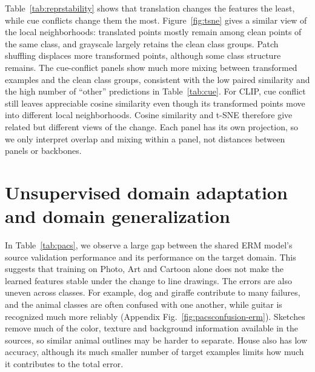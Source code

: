 \documentclass{article}
\begin{document}
Table~\ref{tab:reprstability} shows that translation changes the features the least, while cue conflicts change them the most. Figure~\ref{fig:tsne} gives a similar view of the local neighborhoods: translated points mostly remain among clean points of the same class, and grayscale largely retains the clean class groups. Patch shuffling displaces more transformed points, although some class structure remains. The cue-conflict panels show much more mixing between transformed examples and the clean class groups, consistent with the low paired similarity and the high number of ``other'' predictions in Table~\ref{tab:cue}. For CLIP, cue conflict still leaves appreciable cosine similarity even though its transformed points move into different local neighborhoods. Cosine similarity and t-SNE therefore give related but different views of the change. Each panel has its own projection, so we only interpret overlap and mixing within a panel, not distances between panels or backbones.

\FloatBarrier
\section{Unsupervised domain adaptation and domain generalization}
\label{sec:domain}
In Table~\ref{tab:pacs}, we observe a large gap between the shared ERM model's source validation performance and its performance on the target domain. This suggests that training on Photo, Art and Cartoon alone does not make the learned features stable under the change to line drawings. The errors are also uneven across classes. For example, dog and giraffe contribute to many failures, and the animal classes are often confused with one another, while guitar is recognized much more reliably (Appendix Fig.~\ref{fig:pacsconfusion-erm}). Sketches remove much of the color, texture and background information available in the sources, so similar animal outlines may be harder to separate. House also has low accuracy, although its much smaller number of target examples limits how much it contributes to the total error.
\end{document}
